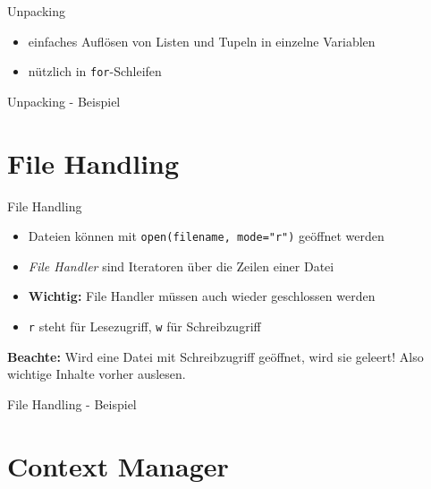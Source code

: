 \begin{frame}{Unpacking}
	\begin{itemize}
		\item einfaches Auflösen von Listen und Tupeln in einzelne Variablen
		\item nützlich in \alert{\texttt{for}}-Schleifen
	\end{itemize}
\end{frame}

\begin{frame}{Unpacking - Beispiel}
	
\end{frame}


\section{File Handling}

\begin{frame}{File Handling}
	\begin{itemize}
		\item Dateien können mit \alert{\texttt{open(filename, mode="r")}} geöffnet werden
		\item \textit{File Handler} sind Iteratoren über die Zeilen einer Datei
		\item \textbf{Wichtig:} File Handler müssen auch wieder geschlossen werden
		\item \texttt{r} steht für Lesezugriff,  \texttt{w} für Schreibzugriff
	\end{itemize}
	\textbf{Beachte:} Wird eine Datei mit Schreibzugriff geöffnet, wird sie geleert! Also wichtige Inhalte vorher auslesen.
\end{frame}

\begin{frame}{File Handling - Beispiel}
	
\end{frame}


\section{Context Manager}

